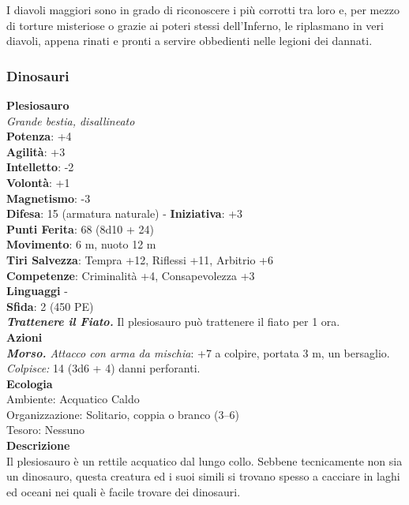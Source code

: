 \begin{multicols}{2}
I diavoli maggiori sono in grado di riconoscere i più corrotti tra loro e, per mezzo di torture misteriose o grazie ai poteri stessi dell’Inferno, le riplasmano in veri diavoli, appena rinati e pronti a servire obbedienti nelle legioni dei dannati.\\

\subsubsection{Dinosauri}

\medskip\textbf{Plesiosauro}\\
\emph{Grande bestia, disallineato}\\
\textbf{Potenza}: +4\\
\textbf{Agilità}: +3\\
\textbf{Intelletto}: -2\\
\textbf{Volontà}: +1\\
\textbf{Magnetismo}: -3\\
\textbf{Difesa}: 15 (armatura naturale) - \textbf{Iniziativa}: +3\\
\textbf{Punti Ferita}: 68 (8d10 + 24)\\
\textbf{Movimento}: 6 m, nuoto 12 m\\
\textbf{Tiri Salvezza}: Tempra +12, Riflessi +11, Arbitrio +6\\
\textbf{Competenze}: Criminalità +4, Consapevolezza +3\\
\textbf{Linguaggi} -\\
\textbf{Sfida}: 2 (450 PE)\smallskip\\
\emph{\textbf{Trattenere il Fiato.}} Il plesiosauro può trattenere il fiato per 1 ora.\\
\smallskip\textbf{Azioni}\\
\emph{\textbf{Morso.} Attacco con arma da mischia}: +7 a colpire, portata 3 m, un bersaglio.\\
\emph{Colpisce:} 14 (3d6 + 4) danni perforanti. \\
\textbf{Ecologia}\\
Ambiente: Acquatico Caldo\\
Organizzazione: Solitario, coppia o branco (3–6)\\
Tesoro: Nessuno\\
\textbf{Descrizione}\\
Il plesiosauro è un rettile acquatico dal lungo collo. Sebbene tecnicamente non sia un dinosauro, questa creatura ed i suoi simili si trovano spesso a cacciare in laghi ed oceani nei quali è facile trovare dei dinosauri.\\


\end{multicols}
